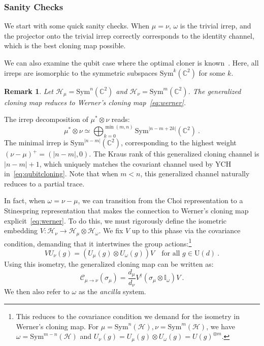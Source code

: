 \documentclass[a4paper,onecolumn,11pt]{quantumarticle}
\newtheorem{rem}{Remark}
\def\h{\mathcal{H}}
\def\id{\mathbb{I}}
\begin{document}
\subsubsection{Sanity Checks}
We start with some quick sanity checks. When $\mu=\nu$, $\omega$ is the trivial irrep, and the projector onto the trivial irrep correctly corresponds to the identity channel, which is the best cloning map possible. 

We can also examine the qubit case where the optimal cloner is known~\cite{werner1998optimal}. Here, all irreps are isomorphic to the symmetric subspaces $\mathrm{Sym}^k(\mathbb{C}^2)$ for some $k$. 
\begin{rem}
    Let $\h_\mu=\mathrm{Sym}^n(\mathbb{C}^2)$ and $\h_\nu= \mathrm{Sym}^m(\mathbb{C}^2)$. The generalized cloning map reduces to Werner's cloning map~\eqref{eq:werner}. 
\end{rem}
The irrep decomposition of $\mu^*\otimes\nu$ reads:
\begin{equation}
    \mu^*\otimes\nu \simeq \bigoplus_{k=0}^{\min(m,n)} \mathrm{Sym}^{|n-m+2k|}(\mathbb{C}^2)\ .
\end{equation}
The minimal irrep is $\mathrm{Sym}^{|n-m|}(\mathbb{C}^2)$, corresponding to the highest weight $(\nu-\mu)^+=(|n-m|,0)$. The Kraus rank of this generalized cloning channel is $|n-m|+1$, which uniquely matches the covariant channel used by YCH in~\eqref{eq:qubitcloning}. Note that when $m<n$, this generalized channel naturally reduces to a partial trace.

In fact, when $\omega=\nu-\mu$, we can transition from the Choi representation to a Stinespring representation that makes the connection to Werner's cloning map explicit~\eqref{eq:werner}. To do this, we must rigorously define the isometric embedding $V: \mathcal{H}_\nu \to \mathcal{H}_\mu \otimes \mathcal{H}_\omega$. We fix $V$ up to this phase via the covariance condition, demanding that it intertwines the group actions:\footnote{This reduces to the covariance condition we demand for the isometry in Werner's cloning map. For $\mu=\mathrm{Sym}^n(\h), \nu=\mathrm{Sym}^m(\h)$, we have $\omega=\mathrm{Sym}^{m-n}(\h)$ and $U_\nu(g)=U_\mu(g)\otimes U_\omega(g)=U(g)^{\otimes m}$.}
\begin{equation}
    V U_\nu(g) = (U_\mu(g) \otimes U_\omega(g)) V \quad \text{for all } g \in \mathrm{U}(d) \ .
\end{equation}
Using this isometry, the generalized cloning map can be written as:
\begin{equation}
    \mathcal{C}_{\mu \to \nu}(\sigma_\mu) = \frac{d_\mu}{d_\nu} V^\dagger (\sigma_\mu \otimes \id_\omega) V\ .
\end{equation}
We then also refer to $\omega$ as the \emph{ancilla} system.
\end{document}
